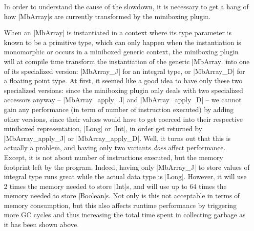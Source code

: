 In order to understand the cause of the slowdown, it is necessary to get a hang of how |MbArray|s are currently transformed by the miniboxing plugin.

When an |MbArray| is instantiated in a context where its type parameter is known to be a primitive type, which can only happen when the instantiation is monomorphic or occurs in a miniboxed generic context, the miniboxing plugin will at compile time transform the instantiation of the generic |MbArray| into one of its specialized version: |MbArray_J| for an integral type, or |MbArray_D| for a floating point type.
At first, it seemed like a good idea to have only these two specialized versions: since the miniboxing plugin only deals with two specialized accessors anyway -- |MbArray_apply_J| and |MbArray_apply_D| -- we cannot gain any performance (in term of number of instruction executed) by adding other versions, since their values would have to get coerced into their respective miniboxed representation, |Long| or |Int|, in order get returned by |MbArray_apply_J| or |MbArray_apply_D|.  
Well, it turns out that this is actually a problem, and having only two variants \emph{does} affect performance. Except, it is not about number of instructions executed, but the memory footprint left by the program. Indeed, having only |MbArray_J| to store values of integral type runs great while the actual data type is |Long|. However, it will use 2 times the memory needed to store |Int|s, and will use up to 64 times the memory needed to store |Boolean|s. Not only is this not acceptable in terms of memory consumption, but this also affects runtime performance by triggering more GC cycles and thus increasing the total time spent in collecting garbage as it has been shown above.


